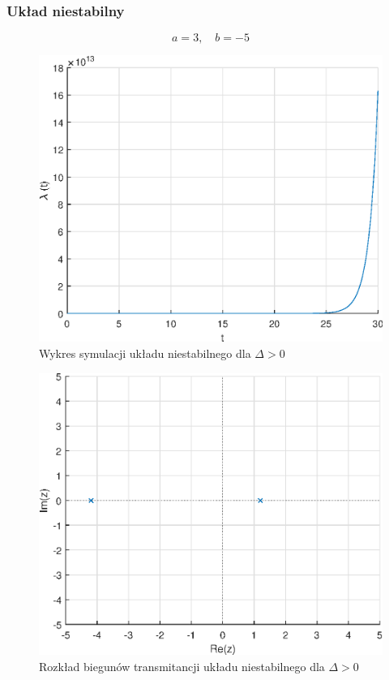 \documentclass[a4paper]{article}
\begin{document}
\subsubsection{Układ niestabilny}
$$
a=3,\quad b=-5
$$
\begin{figure}[H]
    \centering
    \includegraphics[scale=0.6]{a2.eps}
    \caption{Wykres symulacji układu niestabilnego dla $\Delta>0$}
\end{figure}
\begin{figure}[H]
    \centering
    \includegraphics[scale=0.6]{a2_z.eps}
    \caption{Rozkład biegunów transmitancji układu niestabilnego dla $\Delta>0$}
\end{figure}
\end{document}
